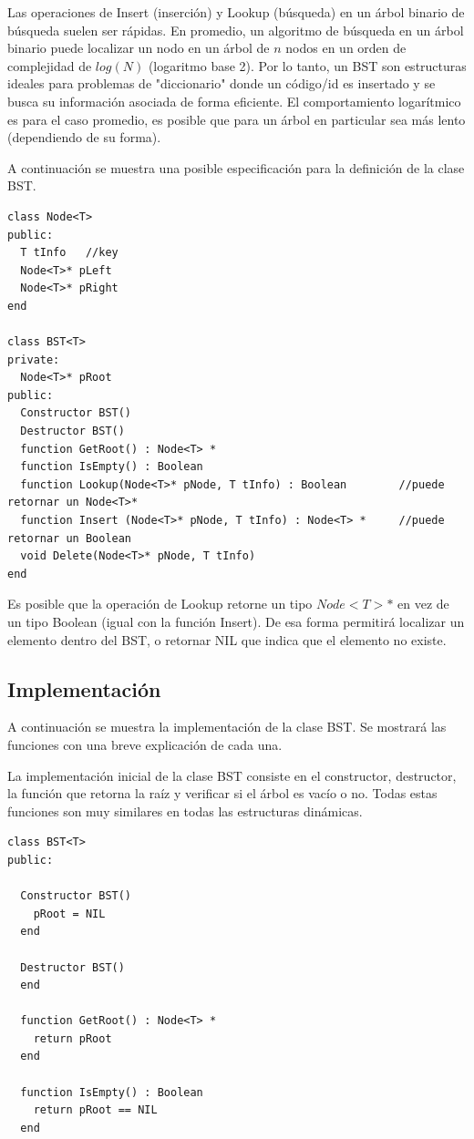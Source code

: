 Las operaciones de Insert (inserción) y Lookup (búsqueda) en un árbol binario de búsqueda suelen ser rápidas. En promedio, un algoritmo de búsqueda en un árbol binario puede localizar un nodo en un árbol de $n$ nodos en un orden de complejidad de $log(N)$ (logaritmo base 2). Por lo tanto, un BST son estructuras ideales para problemas de "diccionario" donde un código/id es insertado y se busca su información asociada de forma eficiente. El comportamiento logarítmico es para el caso promedio, es posible que para un árbol en particular sea más lento (dependiendo de su forma).

A continuación se muestra una posible especificación para la definición de la clase BST.

\begin{lstlisting}[upquote=true, language=pseudo]
class Node<T>
public:
  T tInfo	//key
  Node<T>* pLeft
  Node<T>* pRight
end

class BST<T>
private:
  Node<T>* pRoot
public:
  Constructor BST()
  Destructor BST()
  function GetRoot() : Node<T> *
  function IsEmpty() : Boolean
  function Lookup(Node<T>* pNode, T tInfo) : Boolean  		//puede retornar un Node<T>*
  function Insert (Node<T>* pNode, T tInfo) : Node<T> * 	//puede retornar un Boolean
  void Delete(Node<T>* pNode, T tInfo)
end
\end{lstlisting}

Es posible que la operación de Lookup retorne un tipo $Node<T>*$ en vez de un tipo Boolean (igual con la función Insert). De esa forma permitirá localizar un elemento dentro del BST, o retornar NIL que indica que el elemento no existe.

\subsection{Implementación}

A continuación se muestra la implementación de la clase BST. Se mostrará las funciones con una breve explicación de cada una.

La implementación inicial de la clase BST consiste en el constructor, destructor, la función que retorna la raíz y verificar si el árbol es vacío o no. Todas estas funciones son muy similares en todas las estructuras dinámicas.

\begin{lstlisting}[upquote=true, language=pseudo]
class BST<T>
public:
  
  Constructor BST()
    pRoot = NIL
  end
  
  Destructor BST()
  end
  
  function GetRoot() : Node<T> *
    return pRoot
  end
  
  function IsEmpty() : Boolean 
    return pRoot == NIL
  end
\end{lstlisting}

